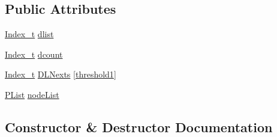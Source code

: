 \subsection*{Public Attributes}
\begin{DoxyCompactItemize}
\item 
\mbox{\hyperlink{class_n_u_c_a_r_lock_free_d_s_1_1_allocator_a2776cca35e8343bf5007bd8b6f3a3f8f}{Index\+\_\+t}} \mbox{\hyperlink{class_n_u_c_a_r_lock_free_d_s_1_1_allocator_1_1_per_thread_state_a70b267fa370752120e752af9651467d7}{dlist}}
\item 
\mbox{\hyperlink{class_n_u_c_a_r_lock_free_d_s_1_1_allocator_a2776cca35e8343bf5007bd8b6f3a3f8f}{Index\+\_\+t}} \mbox{\hyperlink{class_n_u_c_a_r_lock_free_d_s_1_1_allocator_1_1_per_thread_state_add29cc3216c93c4dbc5287dd5c296f07}{dcount}}
\item 
\mbox{\hyperlink{class_n_u_c_a_r_lock_free_d_s_1_1_allocator_a2776cca35e8343bf5007bd8b6f3a3f8f}{Index\+\_\+t}} \mbox{\hyperlink{class_n_u_c_a_r_lock_free_d_s_1_1_allocator_1_1_per_thread_state_acda67994c55201445540612f40ce4381}{D\+L\+Nexts}} \mbox{[}\mbox{\hyperlink{class_n_u_c_a_r_lock_free_d_s_1_1_allocator_a1d220e1cc963fc9fb37e46a416504715}{threshold1}}\mbox{]}
\item 
\mbox{\hyperlink{class_n_u_c_a_r_lock_free_d_s_1_1_allocator_1_1_p_list}{P\+List}} \mbox{\hyperlink{class_n_u_c_a_r_lock_free_d_s_1_1_allocator_1_1_per_thread_state_a034074390f23263717fea75eb0b814b5}{node\+List}}
\end{DoxyCompactItemize}


\subsection{Constructor \& Destructor Documentation}
\mbox{\label{class_n_u_c_a_r_lock_free_d_s_1_1_allocator_1_1_per_thread_state_ac2171d73e5b34d3a391d4f92802f8171}} 
